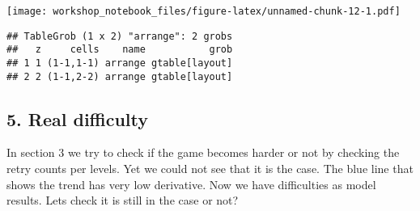 \documentclass[
]{article}
\newenvironment{Shaded}{\begin{snugshade}}{\end{snugshade}}
\newcommand{\AttributeTok}[1]{\textcolor[rgb]{0.77,0.63,0.00}{#1}}
\newcommand{\DecValTok}[1]{\textcolor[rgb]{0.00,0.00,0.81}{#1}}
\newcommand{\FunctionTok}[1]{\textcolor[rgb]{0.00,0.00,0.00}{#1}}
\newcommand{\NormalTok}[1]{#1}
\newcommand{\OtherTok}[1]{\textcolor[rgb]{0.56,0.35,0.01}{#1}}
\newcommand{\SpecialCharTok}[1]{\textcolor[rgb]{0.00,0.00,0.00}{#1}}
\newcommand{\StringTok}[1]{\textcolor[rgb]{0.31,0.60,0.02}{#1}}
\begin{document}
\texttt{[image: workshop\_notebook\_files/figure-latex/unnamed-chunk-12-1.pdf]}

\begin{verbatim}
## TableGrob (1 x 2) "arrange": 2 grobs
##   z     cells    name           grob
## 1 1 (1-1,1-1) arrange gtable[layout]
## 2 2 (1-1,2-2) arrange gtable[layout]
\end{verbatim}

\hypertarget{real-difficulty}{%
\subsection{5. Real difficulty}\label{real-difficulty}}

In section 3 we try to check if the game becomes harder or not by
checking the retry counts per levels. Yet we could not see that it is
the case. The blue line that shows the trend has very low derivative.
Now we have difficulties as model results. Lets check it is still in the
case or not?

\begin{Shaded}
\end{Shaded}
\end{document}
